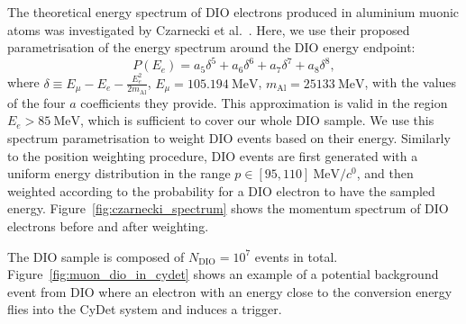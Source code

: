 The theoretical energy spectrum of DIO electrons produced in aluminium muonic
atoms was investigated by Czarnecki et al.~\cite{czarnecki}. Here, we use their
proposed parametrisation of the energy spectrum around the DIO energy endpoint:
\begin{equation}\label{eq:czarnecki_param}
P(E_e) = a_5 \delta^5 + a_6 \delta^6 + a_7 \delta^7 + a_8 \delta^8,
\end{equation}
where $\delta \equiv E_\mu  - E_e - \frac{E_e^2}{2 m_\mathrm{Al}}$, $E_\mu =
\SI{105.194}{\MeV}$, $m_\mathrm{Al} = \SI{25133}{\MeV}$, with the values of the
four $a$ coefficients they provide. This approximation is valid in the region
$E_e > \SI{85}{\MeV}$, which is sufficient to cover our whole DIO sample. We
use this spectrum parametrisation to weight DIO events based on their energy.
Similarly to the position weighting procedure, DIO events are first generated
with a uniform energy distribution in the range $p \in [95,
110]~\si{\MeV/\clight}$, and then weighted according to the probability for a
DIO electron to have the sampled energy. Figure~\ref{fig:czarnecki_spectrum}
shows the momentum spectrum of DIO electrons before and after weighting.

The DIO sample is composed of $N_\mathrm{DIO} = 10^7$ events in total.
Figure~\ref{fig:muon_dio_in_cydet} shows an example of a potential background
event from DIO where an electron with an energy close to the conversion energy
flies into the CyDet system and induces a trigger.

